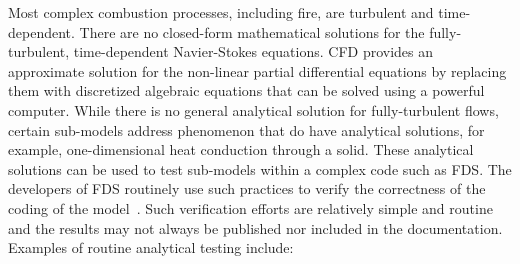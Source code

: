 \documentclass[11pt]{book}
\begin{document}
Most complex combustion processes, including fire, are turbulent and time-dependent. There are no closed-form mathematical solutions for the
fully-turbulent, time-dependent Navier-Stokes equations. CFD provides an approximate solution for the non-linear partial differential equations by
replacing them with discretized algebraic equations that can be solved using a powerful computer. While there is no general analytical solution for
fully-turbulent flows, certain sub-models address phenomenon that do have analytical solutions, for example, one-dimensional heat conduction through
a solid. These analytical solutions can be used to test sub-models within a complex code such as FDS. The developers of FDS routinely use such
practices to verify the correctness of the coding of the model~\cite{Mell:1,McGrattan:4}. Such verification efforts are relatively simple and routine
and the results may not always be published nor included in the documentation. Examples of routine analytical testing include:
\end{document}
